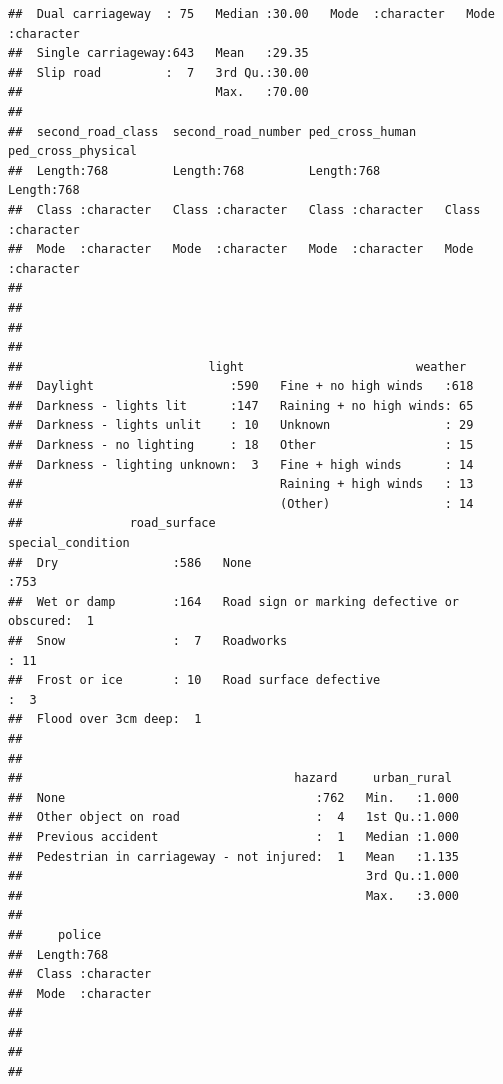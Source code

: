 \documentclass[
]{article}
\begin{document}
\begin{verbatim}
##  Dual carriageway  : 75   Median :30.00   Mode  :character   Mode  :character  
##  Single carriageway:643   Mean   :29.35                                        
##  Slip road         :  7   3rd Qu.:30.00                                        
##                           Max.   :70.00                                        
##                                                                                
##  second_road_class  second_road_number ped_cross_human    ped_cross_physical
##  Length:768         Length:768         Length:768         Length:768        
##  Class :character   Class :character   Class :character   Class :character  
##  Mode  :character   Mode  :character   Mode  :character   Mode  :character  
##                                                                             
##                                                                             
##                                                                             
##                                                                             
##                          light                        weather   
##  Daylight                   :590   Fine + no high winds   :618  
##  Darkness - lights lit      :147   Raining + no high winds: 65  
##  Darkness - lights unlit    : 10   Unknown                : 29  
##  Darkness - no lighting     : 18   Other                  : 15  
##  Darkness - lighting unknown:  3   Fine + high winds      : 14  
##                                    Raining + high winds   : 13  
##                                    (Other)                : 14  
##               road_surface                                  special_condition
##  Dry                :586   None                                      :753    
##  Wet or damp        :164   Road sign or marking defective or obscured:  1    
##  Snow               :  7   Roadworks                                 : 11    
##  Frost or ice       : 10   Road surface defective                    :  3    
##  Flood over 3cm deep:  1                                                     
##                                                                              
##                                                                              
##                                      hazard     urban_rural   
##  None                                   :762   Min.   :1.000  
##  Other object on road                   :  4   1st Qu.:1.000  
##  Previous accident                      :  1   Median :1.000  
##  Pedestrian in carriageway - not injured:  1   Mean   :1.135  
##                                                3rd Qu.:1.000  
##                                                Max.   :3.000  
##                                                               
##     police         
##  Length:768        
##  Class :character  
##  Mode  :character  
##                    
##                    
##                    
## 
\end{verbatim}
\end{document}
